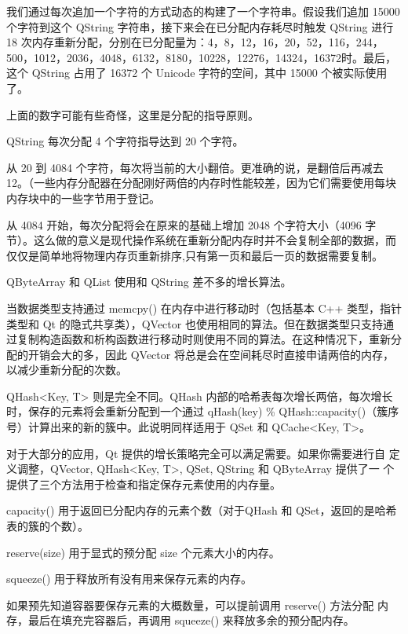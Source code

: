 我们通过每次追加一个字符的方式动态的构建了一个字符串。假设我们追加 15000 个字符到这个 QString 字符串，接下来会在已分配内存耗尽时触发 QString 进行 18 次内存重新分配，分别在已分配量为：4，8，12，16，20，52，116，244，500，1012，2036，4048，6132，8180，10228，12276，14324，16372时。最后，这个 QString 占用了 16372 个 Unicode 字符的空间，其中 15000 个被实际使用了。

上面的数字可能有些奇怪，这里是分配的指导原则。

\begin{compactitem}
\item QString 每次分配 4 个字符指导达到 20 个字符。
\item 从 20 到 4084 个字符，每次将当前的大小翻倍。更准确的说，是翻倍后再减去 12。（一些内存分配器在分配刚好两倍的内存时性能较差，因为它们需要使用每块内存块中的一些字节用于登记。
\item 从 4084 开始，每次分配将会在原来的基础上增加 2048 个字符大小（4096 字节）。这么做的意义是现代操作系统在重新分配内存时并不会复制全部的数据，而仅仅是简单地将物理内存页重新排序,只有第一页和最后一页的数据需要复制。
\end{compactitem}

QByteArray 和 QList 使用和 QString 差不多的增长算法。

当数据类型支持通过 memcpy() 在内存中进行移动时（包括基本 C++ 类型，指针类型和 Qt 的隐式共享类），QVector 也使用相同的算法。但在数据类型只支持通过复制构造函数和析构函数进行移动时则使用不同的算法。在这种情况下，重新分配的开销会大的多，因此 QVector 将总是会在空间耗尽时直接申请两倍的内存，以减少重新分配的次数。

QHash<Key, T> 则是完全不同。QHash 内部的哈希表每次增长两倍，每次增长时，保存的元素将会重新分配到一个通过 qHash(key) \% QHash::capacity()（簇序号）计算出来的新的簇中。此说明同样适用于 QSet 和 QCache<Key, T>。

对于大部分的应用，Qt 提供的增长策略完全可以满足需要。如果你需要进行自
定义调整，QVector, QHash<Key, T>, QSet, QString 和 QByteArray 提供了一
个提供了三个方法用于检查和指定保存元素使用的内存量。

\begin{compactitem}
\item capacity() 用于返回已分配内存的元素个数（对于QHash 和 QSet，返回的是哈希表的簇的个数）。
\item reserve(size) 用于显式的预分配 size 个元素大小的内存。
\item squeeze() 用于释放所有没有用来保存元素的内存。
\end{compactitem}

如果预先知道容器要保存元素的大概数量，可以提前调用 reserve() 方法分配
内存，最后在填充完容器后，再调用 squeeze() 来释放多余的预分配内存。


